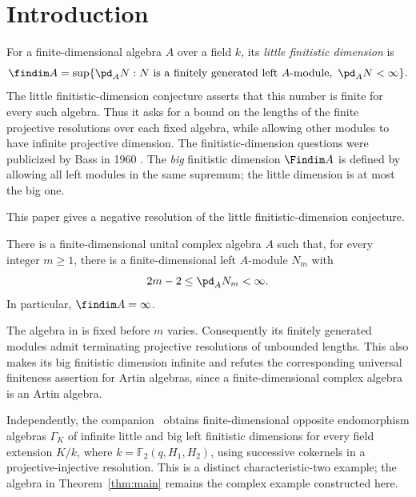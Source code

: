 \begin{abstract}
We construct a finite-dimensional complex algebra whose finite-dimensional
modules have unbounded finite projective dimensions. This disproves the little
finitistic-dimension conjecture.
\end{abstract}

\section{Introduction}
\label{sec:introduction}

For a finite-dimensional algebra \(A\) over a field \(k\), its
\emph{little finitistic dimension} is
\[
\findim A
=\sup\{\pd_A N:
       N\text{ is a finitely generated left }A\text{-module},
       \ \pd_A N<\infty\}.
\]
The little finitistic-dimension conjecture asserts that this number
is finite for every such algebra.  Thus it asks for a bound on the
lengths of the finite projective resolutions over each fixed algebra,
while allowing other modules to have infinite projective dimension.
The finitistic-dimension questions were publicized by Bass in
1960 \cite{Bass1960}.  The \emph{big} finitistic dimension \(\Findim A\)
is defined by allowing all left modules in the same supremum; the little
dimension is at most the big one.

This paper gives a negative resolution of the little
finitistic-dimension conjecture.

\begin{theorem}\label{thm:main}
There is a finite-dimensional unital complex algebra \(A\) such that,
for every integer \(m\ge1\), there is a finite-dimensional left
\(A\)-module \(N_m\) with
\[
2m-2\le\pd_A N_m<\infty.
\]
In particular, \(\findim A=\infty\).
\end{theorem}

The algebra in  is fixed before \(m\) varies.
Consequently its finitely generated modules admit terminating
projective resolutions of unbounded lengths.  This also makes its
big finitistic dimension infinite and refutes the corresponding
universal finiteness assertion for Artin algebras, since a
finite-dimensional complex algebra is an Artin algebra.

Independently, the companion~\cite[Corollary~1.3]{OpenAITachikawa2026}
obtains finite-dimensional opposite endomorphism algebras \(\Gamma_K\)
of infinite little and big left finitistic dimensions for every field
extension \(K/k\), where \(k=\mathbb F_2(q,H_1,H_2)\), using successive
cokernels in a projective-injective resolution. This is a distinct
characteristic-two example; the algebra in Theorem~\ref{thm:main}
remains the complex example constructed here.

